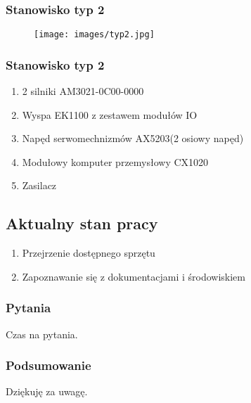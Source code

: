 \documentclass[ucs]{beamer}
\begin{document}
\begin{frame}
\frametitle{Stanowisko typ 2}
\begin{figure}[!htb]	
\centering 	          
\texttt{[image: images/typ2.jpg]}
\end{figure}
\end{frame}

\begin{frame}
\frametitle{Stanowisko typ 2}
\begin{enumerate}
    \item 2 silniki AM3021-0C00-0000
    \item Wyspa EK1100 z zestawem modułów IO
    \item Napęd serwomechnizmów AX5203(2 osiowy napęd)
    \item Modułowy komputer przemysłowy CX1020
    \item Zasilacz
\end{enumerate}
\end{frame}

\subsection{Aktualny stan pracy}
\begin{frame}
\begin{enumerate}
    \item Przejrzenie dostępnego sprzętu
    \item Zapoznawanie się z dokumentacjami i środowiskiem
\end{enumerate}
\end{frame}
\begin{frame}
\frametitle{Pytania}
Czas na pytania.
\end{frame}

\begin{frame}
\frametitle{Podsumowanie}
Dziękuję za uwagę.
\end{frame}
\end{document}
